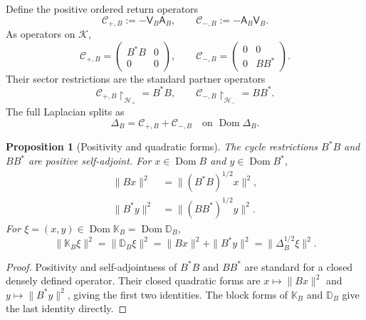 \documentclass[11pt,reqno]{scrartcl}
\newcommand{\scrK}{\mathscr K}
\newcommand{\scrHp}{\mathscr H_{+}}
\newcommand{\scrHm}{\mathscr H_{-}}
\newcommand{\Aop}{\mathsf A}
\newcommand{\Vop}{\mathsf V}
\newcommand{\DB}{\mathbb D}
\newcommand{\KB}{\mathbb K}
\newcommand{\DeltaB}{\Delta}
\DeclareMathOperator{\Dom}{Dom}
\newcommand{\restr}[2]{#1\!\upharpoonright_{#2}}
\theoremstyle{plain}
\newtheorem{proposition}[proposition]{Proposition}
\theoremstyle{definition}
\theoremstyle{remark}
\begin{document}
Define the positive ordered return operators
\begin{equation}
  \mathscr C_{+,B}:=-\Vop_B\Aop_B,
  \qquad
  \mathscr C_{-,B}:=-\Aop_B\Vop_B.
  \label{eq:cycles}
\end{equation}
As operators on \(\scrK\),
\begin{equation}
  \mathscr C_{+,B}=
  \begin{pmatrix}
    B^*B&0\\
    0&0
  \end{pmatrix},
  \qquad
  \mathscr C_{-,B}=
  \begin{pmatrix}
    0&0\\
    0&BB^*
  \end{pmatrix}.
  \label{eq:cycles-block}
\end{equation}
Their sector restrictions are the standard partner operators
\begin{equation}
  \restr{\mathscr C_{+,B}}{\scrHp}=B^*B,
  \qquad
  \restr{\mathscr C_{-,B}}{\scrHm}=BB^*.
  \label{eq:partner-restrictions}
\end{equation}
The full Laplacian splits as
\begin{equation}
  \DeltaB_B=\mathscr C_{+,B}+\mathscr C_{-,B}
  \quad\text{on }\Dom\DeltaB_B.
  \label{eq:Delta-cycle-sum}
\end{equation}

\begin{proposition}[Positivity and quadratic forms]
\label{prop:cycle-positivity}
The cycle restrictions \(B^*B\) and \(BB^*\) are positive self-adjoint. For
\(x\in\Dom B\) and \(y\in\Dom B^*\),
\begin{align}
  \|Bx\|^2&=\| (B^*B)^{1/2}x\|^2,
  \label{eq:B-form}\\
  \|B^*y\|^2&=\|(BB^*)^{1/2}y\|^2.
  \label{eq:Bstar-form}
\end{align}
For \(\xi=(x,y)\in\Dom\KB_B=\Dom\DB_B\),
\begin{equation}
  \|\KB_B\xi\|^2
  =\|\DB_B\xi\|^2
  =\|Bx\|^2+\|B^*y\|^2
  =\|\DeltaB_B^{1/2}\xi\|^2.
  \label{eq:transition-energy}
\end{equation}
\end{proposition}

\begin{proof}
Positivity and self-adjointness of \(B^*B\) and \(BB^*\) are standard for a
closed densely defined operator. Their closed quadratic forms are
\(x\mapsto\|Bx\|^2\) and \(y\mapsto\|B^*y\|^2\), giving the first two
identities. The block forms of \(\KB_B\) and \(\DB_B\) give the last identity
directly.
\end{proof}
\end{document}
